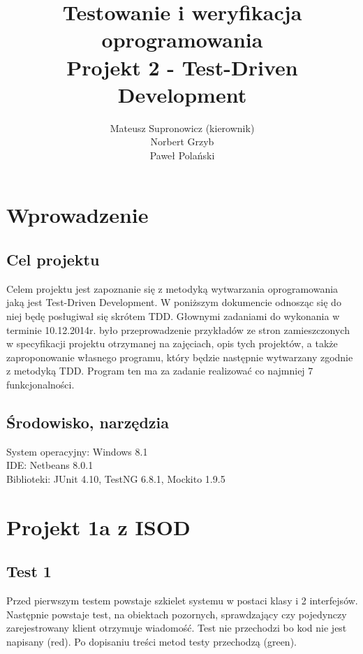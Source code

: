 \documentclass[a4paper,12pt,twoside]{article}
\title{Testowanie i weryfikacja oprogramowania \\ Projekt 2 - Test-Driven Development}
\author{Mateusz Supronowicz (kierownik) \\ Norbert Grzyb \\ Paweł Polański}
\begin{document}
\maketitle


\section{Wprowadzenie}
\bigskip


\subsection{Cel projektu}

Celem projektu jest zapoznanie się z metodyką wytwarzania oprogramowania jaką jest Test-Driven Development.
W poniższym dokumencie odnosząc się do niej będę posługiwał się skrótem TDD. Głownymi zadaniami do
wykonania w terminie 10.12.2014r. było przeprowadzenie przykładów ze stron zamieszczonych w specyfikacji
projektu otrzymanej na zajęciach, opis tych projektów, a także zaproponowanie własnego programu, który
będzie następnie wytwarzany zgodnie z metodyką TDD. Program ten ma za zadanie realizować co najmniej
7 funkcjonalności.

\subsection{Środowisko, narzędzia}

System operacyjny: Windows 8.1\\
IDE: Netbeans 8.0.1\\
Biblioteki: JUnit 4.10, TestNG 6.8.1, Mockito 1.9.5


\section{Projekt 1a z ISOD}
\bigskip


\subsection{Test 1}

Przed pierwszym testem powstaje szkielet systemu w postaci klasy i 2 interfejsów.
Następnie powstaje test, na obiektach pozornych, sprawdzający czy pojedynczy zarejestrowany klient otrzymuje wiadomość.
Test nie przechodzi bo kod nie jest napisany (red). Po dopisaniu treści metod testy przechodzą (green).
\end{document}
